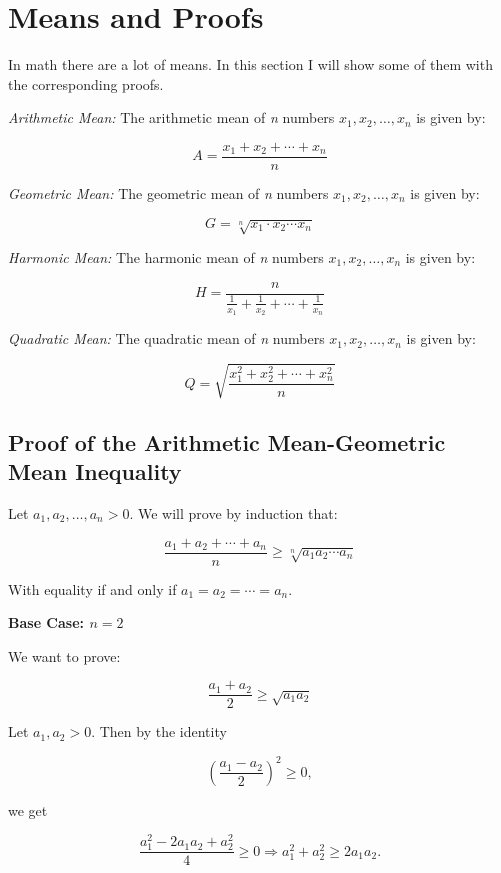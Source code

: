 \newpage
\section{Means and Proofs}
In math there are a lot of means. In this section I will show some of them with the corresponding proofs.

\emph{Arithmetic Mean:} The arithmetic mean of \emph{n} numbers \( x_1, x_2, \dots, x_n \) is given by:

\[
	A = \frac{x_1 + x_2 + \cdots + x_n}{n}
\]

\emph{Geometric Mean:} The geometric mean of \emph{n} numbers \( x_1, x_2, \dots, x_n \) is given by:

\[
	G = \sqrt[n]{x_1 \cdot x_2 \cdots x_n}
\]

\emph{Harmonic Mean:} The harmonic mean of \emph{n} numbers \( x_1, x_2, \dots, x_n \) is given by:

\[
	H = \frac{n}{\frac{1}{x_1} + \frac{1}{x_2} + \cdots + \frac{1}{x_n}}
\]

\emph{Quadratic Mean:} The quadratic mean of \emph{n} numbers \( x_1, x_2, \dots, x_n \) is given by:
	      
\[
	Q = \sqrt{\frac{x_1^2 + x_2^2 + \cdots + x_n^2}{n}}
\]

\subsection{Proof of the Arithmetic Mean-Geometric Mean Inequality}

Let \( a_1, a_2, \dots, a_n > 0 \). We will prove by induction that:

\[
	\frac{a_1 + a_2 + \cdots + a_n}{n} \geq \sqrt[n]{a_1 a_2 \cdots a_n}
\]

With equality if and only if \( a_1 = a_2 = \cdots = a_n \).
\vspace{\baselineskip}

\textbf{Base Case: \( n = 2 \)}
\vspace{\baselineskip}

We want to prove:

\[
	\frac{a_1 + a_2}{2} \geq \sqrt{a_1 a_2}
\]

Let \( a_1, a_2 > 0 \). Then by the identity

\[
	{\left( \frac{a_1 - a_2}{2} \right)}^2 \geq 0,
\]

we get

\[
	\frac{a_1^2 - 2a_1a_2 + a_2^2}{4} \geq 0 \Rightarrow a_1^2 + a_2^2 \geq 2a_1a_2.
\]

